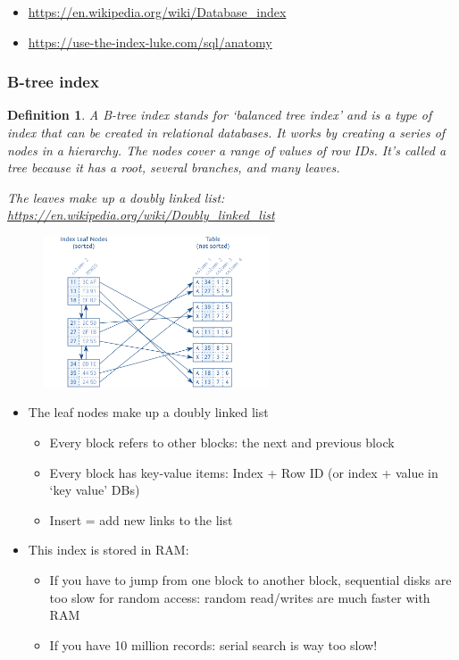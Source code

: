 \documentclass{article}
\newtheorem{theorem}{Definition}[section]
\begin{document}
\begin{itemize}
    \item \url{https://en.wikipedia.org/wiki/Database_index}
    \item \url{https://use-the-index-luke.com/sql/anatomy}
\end{itemize}

\subsubsection{B-tree index}

\begin{theorem}
    A B-tree index stands for `balanced tree index' and is a type of index that can be created in relational databases.
    It works by creating a series of nodes in a hierarchy. The nodes cover a range of values of row IDs. 
    It’s called a tree because it has a root, several branches, and many leaves.
    
    The leaves make up a doubly linked list: \url{https://en.wikipedia.org/wiki/Doubly_linked_list}
    
\end{theorem}

\begin{figure}[H]
    \centering
    \includegraphics[width=0.6\textwidth]{b-tree-index.png}
    \caption{}
\end{figure}

\begin{itemize}
    \item The leaf nodes make up a doubly linked list
    \begin{itemize}
        \item Every block refers to other blocks: the next and previous block
        \item Every block has key-value items: Index + Row ID (or index + value in `key value' DBs)
        \item Insert = add new links to the list
    \end{itemize}
    \item This index is stored in RAM:
    \begin{itemize}
        \item If you have to jump from one block to another block, sequential disks are too slow for random access: random read/writes are much faster with RAM
        \item If you have 10 million records: serial search is way too slow!
    \end{itemize}
\end{itemize}
\end{document}
